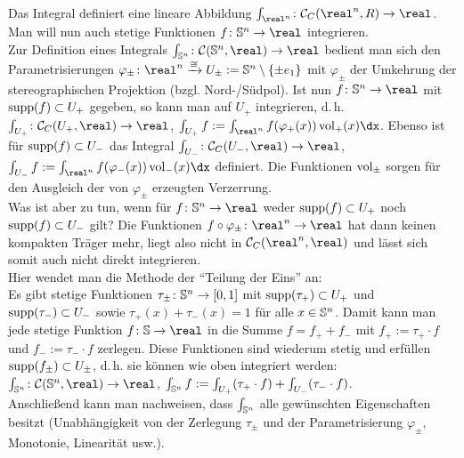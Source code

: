 \begin{Bem}
    Das Integral definiert eine lineare Abbildung
    $\int_{\real^n}\colon \C_C(\real^n, R) \rightarrow \real$. \\
    Man will nun auch stetige Funktionen
    $f\colon \sphere^n \rightarrow \real$ integrieren. \\
    Zur Definition eines Integrals
    $\int_{\sphere^n}\colon \C(\sphere^n, \real) \rightarrow \real$
    bedient man sich den Parametrisierungen
    $\varphi_\pm\colon \real^n \homoe U_\pm :=
    \sphere^n \setminus \{\pm e_1\}$
    mit $\varphi_\pm$ der Umkehrung der stereographischen Projektion
    (bzgl. Nord-/Südpol).
    Ist nun $f\colon \sphere^n \rightarrow \real$ mit $\operatorname{supp}(f) \subset U_+$
    gegeben, so kann man auf $U_+$ integrieren, d.\,h.
    $\int_{U_+}\colon \C_C(U_+, \real) \rightarrow \real$,
    $\int_{U_+} f := \int_{\real^n} f(\varphi_+(x)) \vol_+(x) \dx$.
    Ebenso ist für $\operatorname{supp}(f) \subset U_-$ das Integral
    $\int_{U_-}\colon \C_C(U_-, \real) \rightarrow \real$,
    $\int_{U_-} f := \int_{\real^n} f(\varphi_-(x)) \vol_-(x) \dx$
    definiert.
    Die Funktionen $\operatorname{vol}_\pm$ sorgen für den Ausgleich der von
    $\varphi_\pm$ erzeugten Verzerrung. \\
    Was ist aber zu tun, wenn für $f\colon \sphere^n \rightarrow \real$
    weder $\operatorname{supp}(f) \subset U_+$ noch $\operatorname{supp}(f) \subset U_-$ gilt?
    Die Funktionen $f \circ \varphi_\pm\colon \real^n \rightarrow \real$
    hat dann keinen kompakten Träger mehr, liegt also nicht in
    $\C_C(\real^n, \real)$ und lässt sich somit auch nicht direkt
    integrieren. \\
    Hier wendet man die Methode der "`Teilung der Eins"' an: \\
    Es gibt stetige Funktionen $\tau_\pm\colon \mathbb{S}^n \rightarrow [0, 1]$
    mit $\operatorname{supp}(\tau_+) \subset U_+$ und $\operatorname{supp}(\tau_-) \subset U_-$ sowie
    $\tau_+(x) + \tau_-(x) = 1$ für alle $x \in \mathbb{S}^n$.
    Damit kann man jede stetige Funktion $f\colon \sphere \rightarrow \real$
    in die Summe $f = f_+ + f_-$ mit $f_+ := \tau_+ \cdot f$ und
    $f_- := \tau_- \cdot f$ zerlegen.
    Diese Funktionen sind wiederum stetig und erfüllen
    $\operatorname{supp}(f_\pm) \subset U_\pm$, d.\,h. sie können wie oben integriert werden:
    $\int_{\sphere^n}\colon \C(\sphere^n, \real) \rightarrow \real$,
    $\int_{\mathbb{S}^n} f := \int_{U_+} (\tau_+ \cdot f) +
    \int_{U_-} (\tau_- \cdot f)$. \\
    Anschließend kann man nachweisen, dass $\int_{\mathbb{S}^n}$ alle
    gewünschten Eigenschaften besitzt
    (Unabhängigkeit von der Zerlegung $\tau_\pm$ und der Parametrisierung
    $\varphi_\pm$, Monotonie, Linearität usw.).
\end{Bem}

